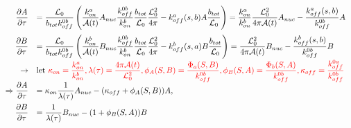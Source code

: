 \[ \begin{array}{rl}
\dfrac{\partial A}{\partial \tau} &= \dfrac{\mathcal{L}_0 }{b_{tot}k_{off}^{0b}} \left (\dfrac{k_{on}^a}{\mathcal{A}(t)} A_{nuc} \dfrac{k_{off}^{0b}}{k_{on}^b} \dfrac{b_{tot}}{\mathcal{L}_0} \dfrac{\mathcal{L}_0^2}{4 \pi} - k_{off}^a (s,b)A \dfrac{b_{tot}}{\mathcal{L}_0} \right)= \dfrac{k_{on}^a}{k_{on}^b}\dfrac{\mathcal{L}_0^2}{4 \pi \mathcal{A}(t)} A_{nuc}  - \dfrac{k_{off}^a (s,b)}{k_{off}^{0b}}A  \\[15pt]

\dfrac{\partial B}{\partial \tau} &= \dfrac{\mathcal{L}_0 }{b_{tot}k_{off}^{0b}} \left(\dfrac{k_{on}^b}{\mathcal{A}(t)}B_{nuc}\dfrac{k_{off}^{0b}}{k_{on}^b} \dfrac{b_{tot}}{\mathcal{L}_0} \dfrac{\mathcal{L}_0^2}{4 \pi} - k_{off}^b  (s,a)B  \dfrac{b_{tot}}{\mathcal{L}_0} \right)= \dfrac{ \mathcal{L}_0^2}{4 \pi \mathcal{A}(t)} B_{nuc}  - \dfrac{k_{off}^b (s,b)}{k_{off}^{0b}}B \\[10pt]


 \rightarrow &\text{let } \textcolor{red}{\kappa_{on} = \dfrac{k_{on}^a}{k_{on}^b}, \lambda(\tau) = \dfrac{4 \pi \mathcal{A}(t)}{\mathcal{L}_0^2}, \phi_A(S,B) = \dfrac{\Phi_a(S,B)}{k_{off}^{0b}}, \phi_B(S,A) = \dfrac{\Phi_b(S,A)}{k_{off}^{0b}}, \kappa_{off} = \dfrac{k_{off}^{0a}}{k_{off}^{0b}}}\\

\Rightarrow \dfrac{\partial A}{\partial \tau} &= \kappa_{on}\dfrac{1}{\lambda (\tau)} A_{nuc}  - (\kappa_{off}+ \phi_A (S,B)) A,  \\[10pt]
\dfrac{\partial B}{\partial \tau} &= \dfrac{1}{\lambda (\tau)} B_{nuc}  - (1+ \phi_B (S,A)) B  \\[10pt]

\end{array}\]

